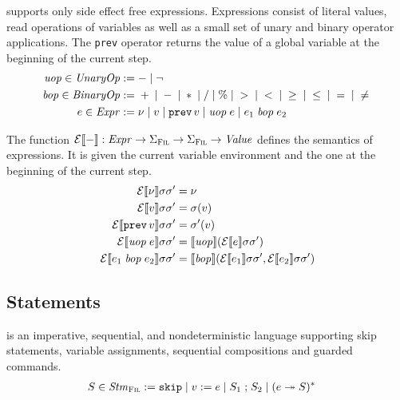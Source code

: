 \documentclass[a4paper,10pt,english]{article}
\begin{document}
\Fil supports only side effect free expressions. Expressions consist of literal values, read operations of variables as
well as a small set of unary and binary operator applications. The \texttt{prev} operator returns the value of a global
variable at the beginning of the current step.
\begin{align*}
	\mathit{uop} \in \mathit{UnaryOp} & := - \mid \neg
	\\
    \mathit{bop} \in \mathit{BinaryOp} & := {} + {} \mid {} - {} \mid {} \ast {} \mid {} / {}
                       \mid {} \% {} \mid {} > {} \mid {} < {} \mid {} \geq {} 
                       \mid {} \leq {} \mid {} = {} \mid {} \neq {}
	\\
	e \in \mathit{Expr} & := 
		\nu \mid
		v \mid
		\mathtt{prev} \,v \mid
		\mathit{uop}\; e \mid
		e_1 \;\mathit{bop}\; e_2
\end{align*}

The function $\mathcal{E} \llbracket - \rrbracket : \mathit{Expr} \rightarrow \Sigma_\textsc{Fil} \rightarrow \Sigma_\textsc{Fil} \rightarrow \mathit{Value}$ defines the semantics of
expressions. It is given the current variable environment and the one at the beginning of the current step.
\begin{align*}
	\mathcal{E} \llbracket \nu \rrbracket \sigma \sigma' &= \nu \\
	\mathcal{E} \llbracket v \rrbracket \sigma \sigma' &= \sigma(v) \\
	\mathcal{E} \llbracket \mathtt{prev} \,v \rrbracket \sigma \sigma' &= \sigma'(v) \\
	\mathcal{E} \llbracket \mathit{uop}\; e \rrbracket \sigma \sigma' &= \llbracket \mathit{uop} \rrbracket (\mathcal{E} \llbracket e \rrbracket \sigma \sigma')
	\\
	\mathcal{E} \llbracket e_1 \;\mathit{bop}\; e_2 \rrbracket \sigma \sigma' &= \llbracket \mathit{bop} \rrbracket (\mathcal{E} \llbracket e_1 \rrbracket
	\sigma \sigma', \mathcal{E} \llbracket e_2 \rrbracket \sigma \sigma')
\end{align*}

\subsection{Statements}

\Fil is an imperative, sequential, and nondeterministic language supporting skip statements, variable assignments, sequential
compositions and guarded commands.
\begin{align*}
	S \in \mathit{Stm}_\textsc{Fil} & :=
		\mathtt{skip} \mid 
		v\; \mathtt{:=}\; e \mid 
		S_1 \; \mathtt{;} \; S_2 \mid
		(e \; \mathtt{\twoheadrightarrow} \; S)^*
\end{align*}
\end{document}
